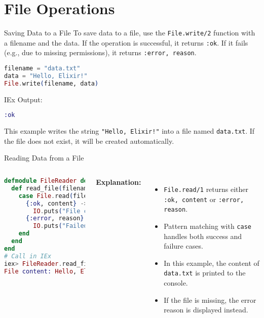 \documentclass[aspectratio=169, table]{beamer}
\begin{document}
\section{File Operations}
\begin{frame}[fragile]{Saving Data to a File}
\vspace{20pt}
To save data to a file, use the \texttt{File.write/2} function with a filename and the data.  
If the operation is successful, it returns \texttt{:ok}.  
If it fails (e.g., due to missing permissions), it returns \texttt{:error, reason}.

\begin{lstlisting}[language=Elixir]
filename = "data.txt"
data = "Hello, Elixir!"
File.write(filename, data)
\end{lstlisting}

IEx Output:
\begin{lstlisting}[language=Elixir]
:ok
\end{lstlisting}

This example writes the string \texttt{"Hello, Elixir!"} into a file named  
\texttt{data.txt}. If the file does not exist, it will be created automatically.
\end{frame}


\begin{frame}[fragile]{Reading Data from a File}
\vspace{20pt}
\begin{columns}[t]

\begin{lstlisting}[language=Elixir]
defmodule FileReader do
  def read_file(filename) do
    case File.read(filename) do
      {:ok, content} ->
        IO.puts("File content: #{content}")
      {:error, reason} ->
        IO.puts("Failed to read file: #{reason}")
    end
  end
end
# Call in IEx
iex> FileReader.read_file("data.txt")
File content: Hello, Elixir!
\end{lstlisting}

\textbf{Explanation:}
\begin{itemize}
  \item \texttt{File.read/1} returns either \texttt{:ok, content} or \texttt{:error, reason}.
  \item Pattern matching with \texttt{case} handles both success and failure cases.
  \item In this example, the content of \texttt{data.txt} is printed to the console.
  \item If the file is missing, the error reason is displayed instead.
\end{itemize}

\end{columns}
\end{frame}
\end{document}
